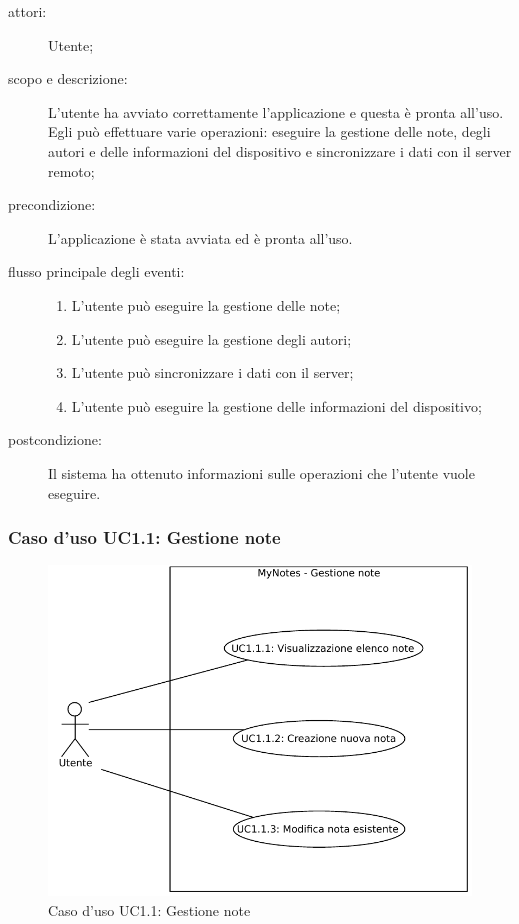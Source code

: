 \begin{description}
\item[attori:] Utente;
\item[scopo e descrizione:] L'utente ha avviato correttamente l'applicazione e questa è pronta all'uso. Egli può effettuare varie operazioni: eseguire la gestione delle note, degli autori e delle informazioni del dispositivo e sincronizzare i dati con il server remoto;
\item[precondizione:] L'applicazione è stata avviata ed è pronta all'uso.
\item[flusso principale degli eventi:] \hfill 
	\begin{enumerate}
	\item L'utente può eseguire la gestione delle note;
	\item L'utente può eseguire la gestione degli autori;
	\item L'utente può sincronizzare i dati con il server;
	\item L'utente può eseguire la gestione delle informazioni del dispositivo;
	\end{enumerate}
\item[postcondizione:] Il sistema ha ottenuto informazioni sulle operazioni che l'utente vuole eseguire.
\end{description}

\subsubsection{Caso d'uso UC1.1: Gestione note}
\begin{figure}[htb]
\centering
\includegraphics[scale=0.6]{gfx/useCase/MN_UC1-1_Gestione_note.pdf}
\caption{Caso d'uso UC1.1: Gestione note}
\label{fig:My notes UC1.1}
\end{figure}

